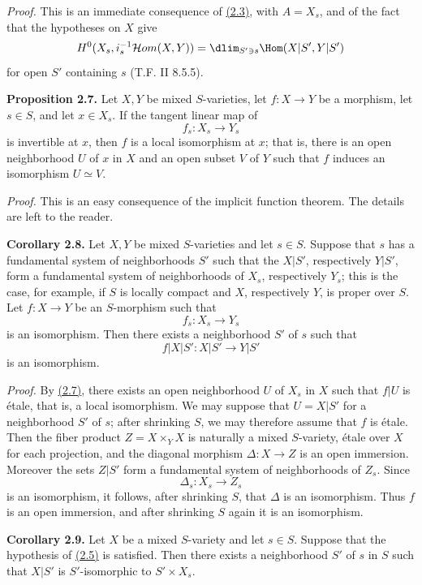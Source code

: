 \emph{Proof.} This is an immediate consequence of \hyperlink{sga6.e02.cor.2-3}{(2.3)}, with $A=X_s$, and of the fact that the hypotheses on $X$ give
\[
 H^0(X_s,i_s^{-1}\mathcal Hom(X,Y))
 =\dlim_{S'\ni s}\Hom(X|S',Y|S')
\]
for open $S'$ containing $s$ (T.F. II 8.5.5).

\textbf{Proposition 2.7.} Let $X,Y$ be mixed $S$-varieties, let $f:X\to Y$ be a morphism, let $s\in S$, and let $x\in X_s$. If the tangent linear map of
\[
 f_s:X_s\longrightarrow Y_s
\]
is invertible at $x$, then $f$ is a local isomorphism at $x$; that is, there is an open neighborhood $U$ of $x$ in $X$ and an open subset $V$ of $Y$ such that $f$ induces an isomorphism $U\simeq V$.

\emph{Proof.} This is an easy consequence of the implicit function theorem. The details are left to the reader.

\textbf{Corollary 2.8.} Let $X,Y$ be mixed $S$-varieties and let $s\in S$. Suppose that $s$ has a fundamental system of neighborhoods $S'$ such that the $X|S'$, respectively $Y|S'$, form a fundamental system of neighborhoods of $X_s$, respectively $Y_s$; this is the case, for example, if $S$ is locally compact and $X$, respectively $Y$, is proper over $S$. Let $f:X\to Y$ be an $S$-morphism such that
\[
 f_s:X_s\longrightarrow Y_s
\]
is an isomorphism. Then there exists a neighborhood $S'$ of $s$ such that
\[
 f|X|S':X|S'\longrightarrow Y|S'
\]
is an isomorphism.

\emph{Proof.} By \hyperlink{sga6.e02.prop.2-7}{(2.7)}, there exists an open neighborhood $U$ of $X_s$ in $X$ such that $f|U$ is étale, that is, a local isomorphism. We may suppose that $U=X|S'$ for a neighborhood $S'$ of $s$; after shrinking $S$, we may therefore assume that $f$ is étale. Then the fiber product $Z=X\times_YX$ is naturally a mixed $S$-variety, étale over $X$ for each projection, and the diagonal morphism $\Delta:X\to Z$ is an open immersion. Moreover the sets $Z|S'$ form a fundamental system of neighborhoods of $Z_s$. Since
\[
 \Delta_s:X_s\longrightarrow Z_s
\]
is an isomorphism, it follows, after shrinking $S$, that $\Delta$ is an isomorphism. Thus $f$ is an open immersion, and after shrinking $S$ again it is an isomorphism.

\textbf{Corollary 2.9.} Let $X$ be a mixed $S$-variety and let $s\in S$. Suppose that the hypothesis of \hyperlink{sga6.e02.cor.2-5}{(2.5)} is satisfied. Then there exists a neighborhood $S'$ of $s$ in $S$ such that $X|S'$ is $S'$-isomorphic to $S'\times X_s$.

